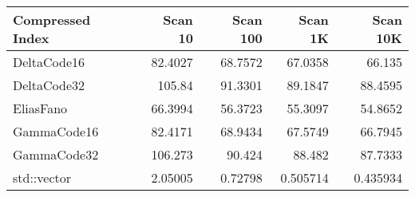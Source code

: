 \begin{tabular}{lrrrr}
\hline
 Compressed Index   &   Scan 10 &   Scan 100 &   Scan 1K &   Scan 10K \\
\hline
 DeltaCode16        &  82.4027  &   68.7572  & 67.0358   &  66.135    \\
 DeltaCode32        & 105.84    &   91.3301  & 89.1847   &  88.4595   \\
 EliasFano          &  66.3994  &   56.3723  & 55.3097   &  54.8652   \\
 GammaCode16        &  82.4171  &   68.9434  & 67.5749   &  66.7945   \\
 GammaCode32        & 106.273   &   90.424   & 88.482    &  87.7333   \\
 std::vector        &   2.05005 &    0.72798 &  0.505714 &   0.435934 \\
\hline
\end{tabular}